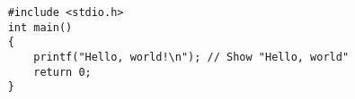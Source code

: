 \begin{verbatim}
	#include <stdio.h>
	int main() 
	{
		printf("Hello, world!\n"); // Show "Hello, world"
		return 0;
	}
\end{verbatim}
